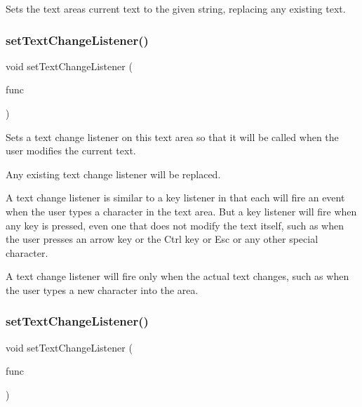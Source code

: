 Sets the text area\textquotesingle{}s current text to the given string, replacing any existing text. 

\mbox{\label{classGTextArea_ae41284f9c540110180ac0ad6beca5cb0}} 
\subsubsection{\texorpdfstring{set\+Text\+Change\+Listener()}{setTextChangeListener()}\hspace{0.1cm}{\footnotesize\ttfamily [1/2]}}
{\footnotesize\ttfamily void set\+Text\+Change\+Listener (\begin{DoxyParamCaption}\item[{G\+Event\+Listener}]{func }\end{DoxyParamCaption})\hspace{0.3cm}{\ttfamily [virtual]}}



Sets a text change listener on this text area so that it will be called when the user modifies the current text. 

Any existing text change listener will be replaced.

A text change listener is similar to a key listener in that each will fire an event when the user types a character in the text area. But a key listener will fire when any key is pressed, even one that does not modify the text itself, such as when the user presses an arrow key or the Ctrl key or Esc or any other special character.

A text change listener will fire only when the actual text changes, such as when the user types a new character into the area. \mbox{\label{classGTextArea_ae8df75b0746951146d29220f386fcd33}} 
\subsubsection{\texorpdfstring{set\+Text\+Change\+Listener()}{setTextChangeListener()}\hspace{0.1cm}{\footnotesize\ttfamily [2/2]}}
{\footnotesize\ttfamily void set\+Text\+Change\+Listener (\begin{DoxyParamCaption}\item[{G\+Event\+Listener\+Void}]{func }\end{DoxyParamCaption})\hspace{0.3cm}{\ttfamily [virtual]}}




